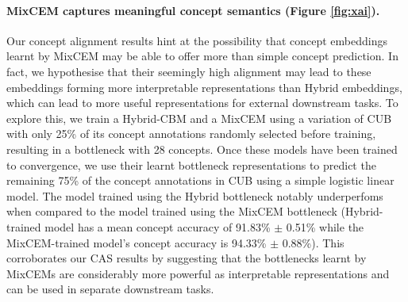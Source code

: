 \paragraph{MixCEM captures meaningful concept semantics (Figure \ref{fig:xai}).}
Our concept alignment results hint at the possibility that concept embeddings learnt by MixCEM may be able to offer more than simple concept prediction. In fact, we hypothesise that their seemingly high alignment may lead to these embeddings forming more interpretable representations than Hybrid embeddings, which can lead to more useful representations for external downstream tasks. To explore this, we train a Hybrid-CBM and a MixCEM using a variation of CUB with only 25\% of its concept annotations randomly selected before training, resulting in a bottleneck with 28 concepts. Once these models have been trained to convergence,
we use their learnt bottleneck representations to predict the remaining 75\% of the concept annotations in CUB using a simple logistic linear model. The model trained using the Hybrid bottleneck notably underperfoms when compared to the model trained using the MixCEM bottleneck (Hybrid-trained model has a mean concept accuracy of 91.83\% $\pm$ 0.51\% while the MixCEM-trained model's concept accuracy is 94.33\% $\pm$ 0.88\%). This corroborates our CAS results by suggesting that the bottlenecks learnt by MixCEMs are considerably more powerful as interpretable representations and can be used in separate downstream tasks.

